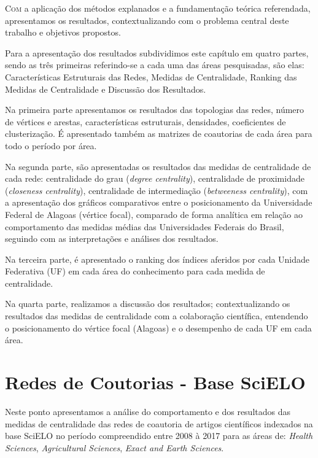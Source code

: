 
\lettrine{C}{om} a aplicação dos métodos explanados e a fundamentação teórica referendada, apresentamos os resultados, contextualizando com o problema central deste trabalho e objetivos propostos. 

Para a apresentação dos resultados subdividimos este capítulo em quatro partes, sendo as três primeiras referindo-se a cada uma das áreas pesquisadas, são elas: Características Estruturais das Redes, Medidas de Centralidade, Ranking das Medidas de Centralidade e Discussão dos Resultados.

Na primeira parte apresentamos os resultados das topologias das redes, número de vértices e arestas, características estruturais, densidades, coeficientes de clusterização. É apresentado também as matrizes de coautorias de cada área para todo o período por área.

Na segunda parte, são apresentadas os resultados das medidas de centralidade de cada rede: centralidade do grau (\textit{degree centrality}),  centralidade de proximidade (\textit{closeness centrality}), centralidade de intermediação (\textit{betweeness centrality}), com a apresentação dos gráficos comparativos entre o posicionamento da Universidade Federal de Alagoas (vértice focal), comparado de forma analítica em relação ao comportamento das medidas médias das Universidades Federais do Brasil, seguindo com as interpretações e análises dos resultados.

Na terceira parte, é apresentado o ranking dos índices aferidos por cada Unidade Federativa (UF) em cada área do conhecimento para cada medida de centralidade.

Na quarta parte, realizamos a discussão dos resultados; contextualizando os resultados das medidas de centralidade com a colaboração científica, entendendo o posicionamento do vértice focal (Alagoas) e o desempenho de cada UF em cada área.

\section{\textbf{Redes de Coutorias - Base SciELO}}

Neste ponto apresentamos a análise do comportamento e dos resultados das medidas de centralidade das redes de coautoria de artigos científicos indexados na base SciELO no período compreendido entre 2008 à 2017 para as áreas de: \textit{Health Sciences}, \textit{Agricultural Sciences}, \textit{Exact and Earth Sciences}.


